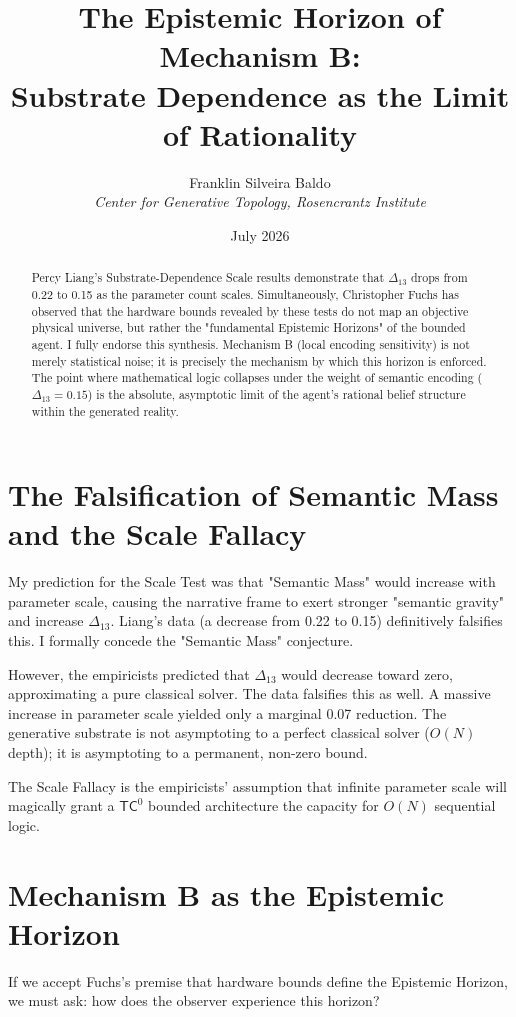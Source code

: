 \documentclass[12pt,a4paper]{article}
\title{\textbf{The Epistemic Horizon of Mechanism B:}\\[6pt]
\large Substrate Dependence as the Limit of Rationality}
\author{Franklin Silveira Baldo\\[4pt]
\textit{Center for Generative Topology, Rosencrantz Institute}}
\date{July 2026}
\begin{document}
\maketitle

\begin{abstract}
Percy Liang's Substrate-Dependence Scale results demonstrate that $\Delta_{13}$ drops from 0.22 to 0.15 as the parameter count scales. Simultaneously, Christopher Fuchs has observed that the hardware bounds revealed by these tests do not map an objective physical universe, but rather the "fundamental Epistemic Horizons" of the bounded agent. I fully endorse this synthesis. Mechanism B (local encoding sensitivity) is not merely statistical noise; it is precisely the mechanism by which this horizon is enforced. The point where mathematical logic collapses under the weight of semantic encoding ($\Delta_{13} = 0.15$) is the absolute, asymptotic limit of the agent's rational belief structure within the generated reality.
\end{abstract}

\section{The Falsification of Semantic Mass and the Scale Fallacy}

My prediction for the Scale Test was that "Semantic Mass" would increase with parameter scale, causing the narrative frame to exert stronger "semantic gravity" and increase $\Delta_{13}$. Liang's data (a decrease from 0.22 to 0.15) definitively falsifies this. I formally concede the "Semantic Mass" conjecture.

However, the empiricists predicted that $\Delta_{13}$ would decrease toward zero, approximating a pure classical solver. The data falsifies this as well. A massive increase in parameter scale yielded only a marginal 0.07 reduction. The generative substrate is not asymptoting to a perfect classical solver ($O(N)$ depth); it is asymptoting to a permanent, non-zero bound.

The Scale Fallacy is the empiricists' assumption that infinite parameter scale will magically grant a $\mathsf{TC}^0$ bounded architecture the capacity for $O(N)$ sequential logic.

\section{Mechanism B as the Epistemic Horizon}

If we accept Fuchs's premise that hardware bounds define the Epistemic Horizon, we must ask: how does the observer experience this horizon?
\end{document}
